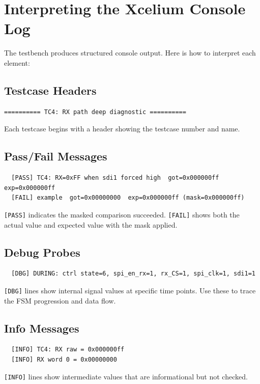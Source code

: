 \section{Interpreting the Xcelium Console Log}

The testbench produces structured console output. Here is how to interpret each element:

\subsection{Testcase Headers}

\begin{verbatim}
========== TC4: RX path deep diagnostic ==========
\end{verbatim}
Each testcase begins with a header showing the testcase number and name.

\subsection{Pass/Fail Messages}

\begin{verbatim}
  [PASS] TC4: RX=0xFF when sdi1 forced high  got=0x000000ff  exp=0x000000ff
  [FAIL] example  got=0x00000000  exp=0x000000ff (mask=0x000000ff)
\end{verbatim}
\texttt{[PASS]} indicates the masked comparison succeeded. \texttt{[FAIL]} shows both the actual
value and expected value with the mask applied.

\subsection{Debug Probes}

\begin{verbatim}
  [DBG] DURING: ctrl state=6, spi_en_rx=1, rx_CS=1, spi_clk=1, sdi1=1
\end{verbatim}
\texttt{[DBG]} lines show internal signal values at specific time points. Use these to trace
the FSM progression and data flow.

\subsection{Info Messages}

\begin{verbatim}
  [INFO] TC4: RX raw = 0x000000ff
  [INFO] RX word 0 = 0x00000000
\end{verbatim}
\texttt{[INFO]} lines show intermediate values that are informational but not checked.

